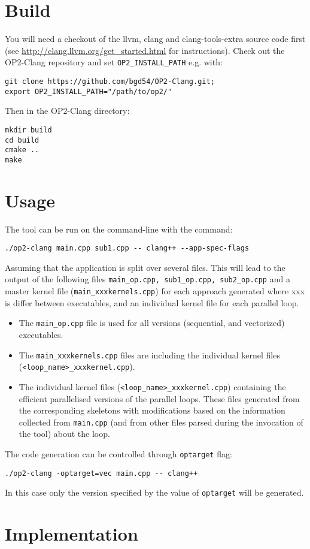 \documentclass{article}
\begin{document}
\section{Build}
You will need a checkout of the llvm, clang and clang-tools-extra source code first (see \url{http://clang.llvm.org/get_started.html} for instructions). Check out the OP2-Clang repository and set {\tt OP2\_INSTALL\_PATH} e.g. with:\\
\begin{lstlisting}
git clone https://github.com/bgd54/OP2-Clang.git;
export OP2_INSTALL_PATH="/path/to/op2/"
\end{lstlisting}
Then in the OP2-Clang directory:
\begin{lstlisting}
mkdir build
cd build
cmake ..
make
\end{lstlisting}

\section{Usage}
The tool can be run on the command-line with the command:
\begin{lstlisting}
./op2-clang main.cpp sub1.cpp -- clang++ --app-spec-flags
\end{lstlisting}
Assuming that the application is split over several files. This will lead to the output of the following files {\tt main\_op.cpp, sub1\_op.cpp, sub2\_op.cpp} and a master kernel file ({\tt main\_xxxkernels.cpp}) for each approach generated where xxx is differ between executables, and an individual kernel file for each parallel loop.
\begin{itemize}
    \item The {\tt main\_op.cpp} file is used for all versions (sequential, \omp and vectorized) executables.
    \item The {\tt main\_xxxkernels.cpp} files are including the individual kernel files ({\tt <loop\_name>\_xxxkernel.cpp}).
    \item The individual kernel files ({\tt <loop\_name>\_xxxkernel.cpp}) containing the efficient parallelised versions of the parallel loops. These files generated from the corresponding skeletons with modifications based on the information collected from {\tt main.cpp} (and from other files parsed during the invocation of the tool) about the loop.
\end{itemize}
The code generation can be controlled through {\tt optarget} flag:
\begin{lstlisting}
./op2-clang -optarget=vec main.cpp -- clang++
\end{lstlisting}
In this case only the version specified by the value of {\tt optarget} will be generated.

\section{Implementation}

\end{document}
